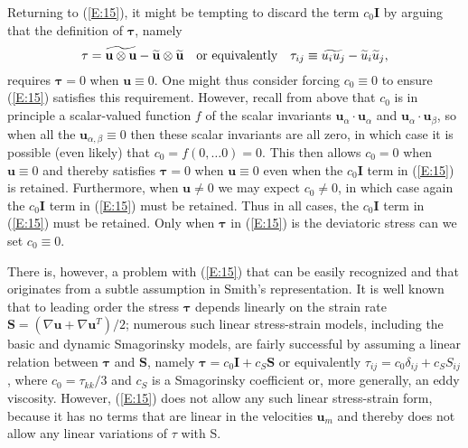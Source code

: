 Returning to (\ref{E:15}), it might be tempting to discard the term  $c_0\mathbf{I}$ by arguing that the definition of $\mathbf{\tau}$, namely
%
\begin{equation}
\label{E:16}
	\mathbf{\tau} = \widetilde{\mathbf{u} \otimes \mathbf{u}} 
		 - \widetilde{\mathbf{u}} \otimes \widetilde{\mathbf{u}}
	\quad \textnormal{or equivalently} \quad
	\tau_{ij} \equiv \widetilde{u_i u_j} - \widetilde{u}_i \widetilde{u}_j,  
\end{equation}
%
%        
requires $\mathbf{\tau} = 0$  when $\mathbf{u} \equiv 0$. One might thus consider forcing $c_0 \equiv 0$  to ensure (\ref{E:15}) satisfies this requirement.  However, recall from above that $c_0$  is in principle a scalar-valued function $f$  of the scalar invariants  $\mathbf{u}_{\alpha} \cdot \mathbf{u}_{\alpha}$ and $\mathbf{u}_{\alpha} \cdot \mathbf{u}_{\beta}$, so when all the  $\mathbf{u}_{\alpha, \beta} \equiv 0$ then these scalar invariants are all zero, in which case it is possible (even likely) that $c_0 = f(0,\ldots0) = 0$.  This then allows $c_0 = 0$   when  $\mathbf{u} \equiv 0$ and thereby satisfies $\mathbf{\tau} = 0$  when  $\mathbf{u} \equiv 0$ even when the $c_0 \mathbf{I}$  term in (\ref{E:15}) is retained.  Furthermore, when $\mathbf{u} \neq 0$  we may expect $c_0 \neq 0$, in which case again the $c_0 \mathbf{I}$ term in (\ref{E:15}) must be retained.  Thus in all cases, the  $c_0 \mathbf{I}$ term in (\ref{E:15}) must be retained.  Only when  $\mathbf{\tau}$ in (\ref{E:15}) is the deviatoric stress can we set $c_0 \equiv 0$.




There is, however, a problem with (\ref{E:15}) that can be easily recognized and that originates from a subtle assumption in Smith’s representation.  It is well known that to leading order the stress  $\mathbf{\tau}$ depends linearly on the strain rate $\mathbf{S} = (\nabla \mathbf{u} + \nabla \mathbf{u}^T)/2$; numerous such linear stress-strain models, including the basic and dynamic Smagorinsky models, are fairly successful by assuming a linear relation between $\mathbf{\tau}$  and $\mathbf{S}$, namely $\mathbf{\tau} = c_0\mathbf{I} + c_S \mathbf{S}$  or equivalently $\tau_{ij} = c_0\delta_{ij} + c_S S_{ij}$, where $c_0 = \tau_{kk}/3$  and $c_S$  is a Smagorinsky coefficient or, more generally, an eddy viscosity.  However, (\ref{E:15}) does not allow any such linear stress-strain form, because it has no terms that are linear in the velocities $\mathbf{u}_{m}$  and thereby does not allow any linear variations of $\tau$ with S.

